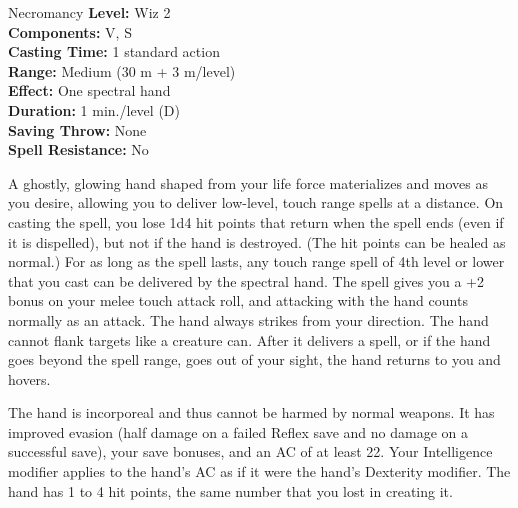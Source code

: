 {Necromancy}
{
	\textbf{Level:}
	Wiz 2\\
	\textbf{Components:}
	V, S\\
	\textbf{Casting Time:}
	1 standard action\\
	\textbf{Range:}
	Medium (30 m + 3 m/level)\\
	\textbf{Effect:}
	One spectral hand\\
	\textbf{Duration:}
	1 min./level (D)\\
	\textbf{Saving Throw:}
	None\\
	\textbf{Spell Resistance:}
	No\\
}
{
	A ghostly, glowing hand shaped from your life force materializes and moves as you desire, allowing you to deliver low-level, touch range spells at a distance. On casting the spell, you lose 1d4 hit points that return when the spell ends (even if it is dispelled), but not if the hand is destroyed. (The hit points can be healed as normal.) For as long as the spell lasts, any touch range spell of 4th level or lower that you cast can be delivered by the spectral hand. The spell gives you a +2 bonus on your melee touch attack roll, and attacking with the hand counts normally as an attack. The hand always strikes from your direction. The hand cannot flank targets like a creature can. After it delivers a spell, or if the hand goes beyond the spell range, goes out of your sight, the hand returns to you and hovers.

	The hand is incorporeal and thus cannot be harmed by normal weapons. It has improved evasion (half damage on a failed Reflex save and no damage on a successful save), your save bonuses, and an AC of at least 22. Your Intelligence modifier applies to the hand's AC as if it were the hand's Dexterity modifier. The hand has 1 to 4 hit points, the same number that you lost in creating it.

}
